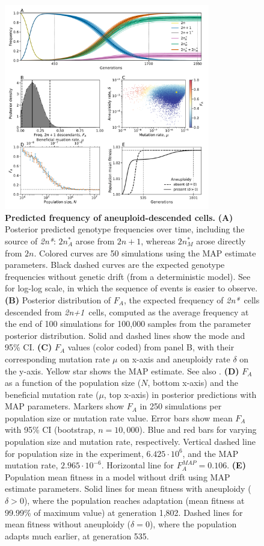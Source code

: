 \documentclass[12pt]{extarticle}
\newcommand{\anwt}{\emph{2n+1}}
\newcommand{\eumt}{\emph{2n*}}
\begin{document}
\begin{figure}[p]
      \centering
      \includegraphics[width=0.8\textwidth]{../figures/FA.pdf}      
  \caption{
    \textbf{Predicted frequency of aneuploid-descended cells.}     
    \textbf{(A)} Posterior predicted genotype frequencies over time, including the source of \eumt: $2n^*_A$ arose from $2n+1$, whereas $2n^*_M$ arose directly from $2n$. Colored curves are 50 simulations using the MAP estimate parameters. Black dashed curves are the expected genotype frequencies without genetic drift (from a deterministic model). 
     See  for log-log scale, in which the sequence of events is easier to observe.
    \textbf{(B)} Posterior distribution of $F_A$, the expected frequency of \eumt\ cells descended from \anwt\ cells, computed as the average frequency at the end of 100 simulations for 100,000 samples from the parameter posterior distribution.
    Solid and dashed lines show the mode and 95\% CI.
	\textbf{(C)} $F_A$ values (color coded) from panel B, with their corresponding mutation rate $\mu$ on x-axis and aneuploidy rate $\delta$ on the y-axis.
	Yellow star shows the MAP estimate. See also .
	\textbf{(D)} $F_A$ as a function of the population size ($N$, bottom x-axis) and the beneficial mutation rate ($\mu$, top x-axis) in posterior predictions with MAP parameters. 
	Markers show $F_A$ in 250 simulations per population size or mutation rate value.
	Error bars show mean $F_A$ with 95\% CI (bootstrap, $n=10,000$). Blue and red bars for varying population size and mutation rate, respectively.
	Vertical dashed line for population size in the experiment, $6.425\cdot10^6$, and the MAP mutation rate, $2.965\cdot10^{-6}$. Horizontal line for $F_A^{MAP}=0.106$. 
	\textbf{(E)} Population mean fitness in a model without drift using MAP estimate parameters. Solid lines for mean fitness with aneuploidy ($\delta>0$), where the population reaches adaptation (mean fitness at 99.99\% of maximum value) at generation 1,802. Dashed lines for mean fitness without aneuploidy ($\delta=0$), where the population adapts much earlier, at generation 535.
     }
  \label{fig:FA}
\end{figure}
\end{document}

